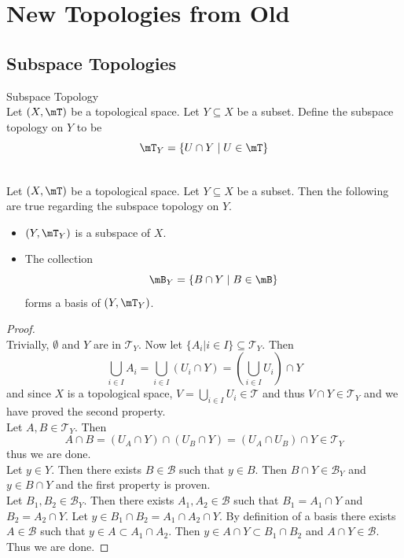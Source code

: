 \documentclass[a4paper]{article}
\begin{document}
\pagebreak
\section{New Topologies from Old}
\subsection{Subspace Topologies}
\begin{defn}{Subspace Topology}{}\\
Let $(X,\mT)$ be a topological space. Let $Y\subseteq X$ be a subset. Define the subspace topology on $Y$ to be $$\mT_Y=\{U\cap Y\;|\;U\in\mT\}$$
\end{defn}

\begin{prp}{}{}\\
Let $(X,\mT)$ be a topological space. Let $Y\subseteq X$ be a subset. Then the following are true regarding the subspace topology on $Y$. 
\begin{itemize}
\item $(Y,\mT_Y)$ is a subspace of $X$. 
\item The collection $$\mB_Y=\{B\cap Y\;|\;B\in\mB\}$$ forms a basis of $(Y,\mT_Y)$. 
\end{itemize}
\begin{proof}\\
Trivially, $\emptyset$ and $Y$ are in $\mathcal{T}_Y$. Now let $\{A_i|i\in I\}\subseteq\mathcal{T}_Y$. Then $$\bigcup_{i\in I}A_i=\bigcup_{i\in I}(U_i\cap Y)=\left(\bigcup_{i\in I}U_i\right)\cap Y$$ and since $X$ is a topological space, $V=\bigcup_{i\in I}U_i\in\mathcal{T}$ and thus $V\cap Y\in\mathcal{T}_Y$ and we have proved the second property. \\
Let $A,B\in\mathcal{T}_Y$. Then $$A\cap B=(U_A\cap Y)\cap(U_B\cap Y)=(U_A\cap U_B)\cap Y\in\mathcal{T}_Y$$ thus we are done. \\

Let $y\in Y$. Then there exists $B\in\mathcal{B}$ such that $y\in B$. Then $B\cap Y\in\mathcal{B}_Y$ and $y\in B\cap Y$ and the first property is proven. \\
Let $B_1,B_2\in\mathcal{B}_Y$. Then there exists $A_1,A_2\in\mathcal{B}$ such that $B_1=A_1\cap Y$ and $B_2=A_2\cap Y$.  Let $y\in B_1\cap B_2=A_1\cap A_2\cap Y$. By definition of a basis there exists $A\in\mathcal{B}$ such that $y\in A\subset A_1\cap A_2$. Then $y\in A\cap Y\subset B_1\cap B_2$ and $A\cap Y\in\mathcal{B}$. Thus we are done. 
\end{proof}
\end{prp}
\end{document}
